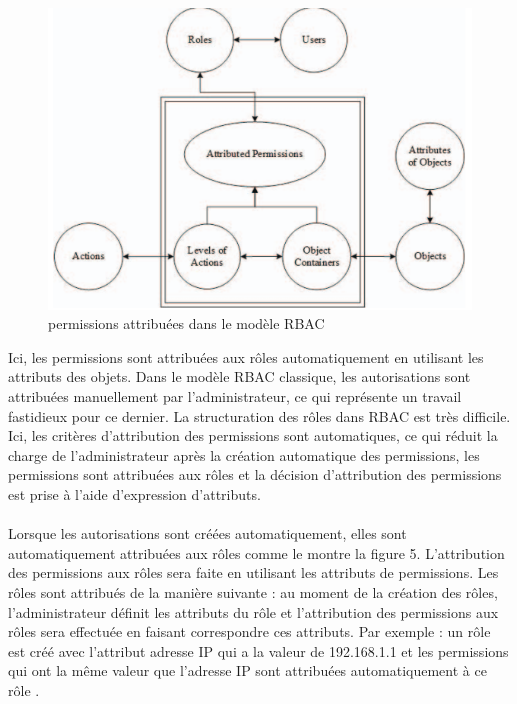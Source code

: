 \begin{figure}[h!]
    \centering
		\includegraphics[scale=0.7]{chap2/images/roleAttribue.png}
    \caption{permissions attribuées dans le modèle RBAC}
	 \label{figPermissionAttribué}
\end{figure}
 
\label{sectionAttributionAutoAR-BAC}

Ici, les permissions sont attribuées aux rôles automatiquement en utilisant les attributs des objets. Dans le modèle RBAC classique, les autorisations sont attribuées manuellement par l'administrateur, ce qui représente un travail fastidieux pour ce dernier. La structuration des rôles dans RBAC est très difficile. Ici, les critères d'attribution des permissions sont automatiques, ce qui réduit la charge de l'administrateur après la création automatique des permissions, les permissions sont attribuées aux rôles et la décision d'attribution des permissions est prise à l'aide d'expression d'attributs.
\paragraph{} Lorsque les autorisations sont créées automatiquement, elles sont automatiquement attribuées aux rôles comme le montre la figure 5. L'attribution des permissions aux rôles sera faite en utilisant les attributs de permissions. Les rôles sont attribués de la manière suivante : au moment de la création des rôles, l'administrateur définit les attributs du rôle et l'attribution des permissions aux rôles sera effectuée en faisant correspondre ces attributs. Par exemple : un rôle est créé avec l'attribut adresse IP qui a la valeur de 192.168.1.1 et les permissions qui ont la même valeur que l'adresse IP sont attribuées automatiquement à ce rôle .

